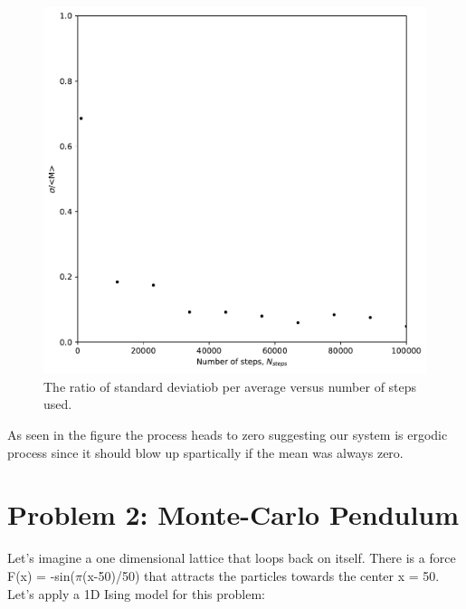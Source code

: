 \documentclass[a4paper]{article}
\theoremstyle{definition}
\begin{document}
\begin{figure}[H]
\centering
\includegraphics[width = 10 cm]{Comp_set_1/Confined_Lattice.pdf}
\caption{The ratio of standard deviatiob per average versus number of steps used.
}
\label{fig:confined_lattice}
\end{figure}  
As seen in the figure the process heads to zero suggesting our system is ergodic process since it should blow up spartically if the mean was always zero. 
\section{Problem 2: Monte-Carlo Pendulum}
Let's imagine a one dimensional lattice that loops back on itself. There is a force F(x) = -sin($\pi$(x-50)/50) that attracts the particles towards the center x = 50. Let's apply a 1D Ising model for this problem:
\end{document}
